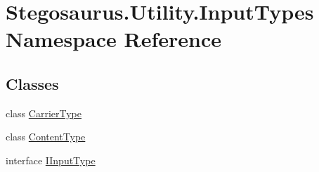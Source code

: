 \hypertarget{namespace_stegosaurus_1_1_utility_1_1_input_types}{}\section{Stegosaurus.\+Utility.\+Input\+Types Namespace Reference}
\label{namespace_stegosaurus_1_1_utility_1_1_input_types}
\subsection*{Classes}
\begin{DoxyCompactItemize}
\item 
class \hyperlink{class_stegosaurus_1_1_utility_1_1_input_types_1_1_carrier_type}{Carrier\+Type}
\item 
class \hyperlink{class_stegosaurus_1_1_utility_1_1_input_types_1_1_content_type}{Content\+Type}
\item 
interface \hyperlink{interface_stegosaurus_1_1_utility_1_1_input_types_1_1_i_input_type}{I\+Input\+Type}
\end{DoxyCompactItemize}
